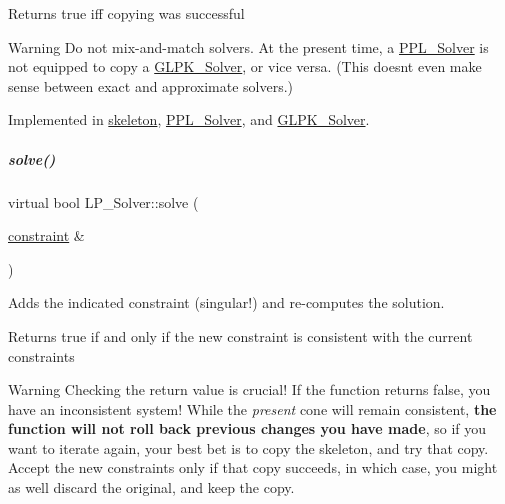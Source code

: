 \begin{DoxyReturn}{Returns}
{\ttfamily true} iff copying was successful 
\end{DoxyReturn}
\begin{DoxyWarning}{Warning}
Do not mix-\/and-\/match solvers. At the present time, a \hyperlink{group___c_l_s_solvers_class_p_p_l___solver}{P\+P\+L\+\_\+\+Solver} is not equipped to copy a \hyperlink{group___c_l_s_solvers_class_g_l_p_k___solver}{G\+L\+P\+K\+\_\+\+Solver}, or vice versa. (This doesn\textquotesingle{}t even make sense between exact and approximate solvers.) 
\end{DoxyWarning}


Implemented in \hyperlink{group___c_l_s_solvers_a42d30b92f27936eab11d0fa4f0cc10b4}{skeleton}, \hyperlink{group___c_l_s_solvers_a67408174d2260de5ae5f070a70f27e9d}{P\+P\+L\+\_\+\+Solver}, and \hyperlink{group___c_l_s_solvers_aff3a58ef3def363dfad9e0ba8eee3e67}{G\+L\+P\+K\+\_\+\+Solver}.

\mbox{\label{group___c_l_s_solvers_abd84374c52124116becc8924dc74e12d}} 
\subparagraph{\texorpdfstring{solve()}{solve()}\hspace{0.1cm}{\footnotesize\ttfamily [1/2]}}
{\footnotesize\ttfamily virtual bool L\+P\+\_\+\+Solver\+::solve (\begin{DoxyParamCaption}\item[{\hyperlink{group___c_l_s_solvers_classconstraint}{constraint} \&}]{ }\end{DoxyParamCaption})\hspace{0.3cm}{\ttfamily [pure virtual]}}



Adds the indicated constraint (singular!) and re-\/computes the solution. 

\begin{DoxyReturn}{Returns}
{\ttfamily true} if and only if the new constraint is consistent with the current constraints
\end{DoxyReturn}
\begin{DoxyWarning}{Warning}
Checking the return value is crucial! If the function returns {\ttfamily false}, you have an inconsistent system! While the {\itshape present} cone will remain consistent, {\bfseries the function will not roll back previous changes you have made}, so if you want to iterate again, your best bet is to copy the skeleton, and try that copy. Accept the new constraints only if that copy succeeds, in which case, you might as well discard the original, and keep the copy. 
\end{DoxyWarning}


